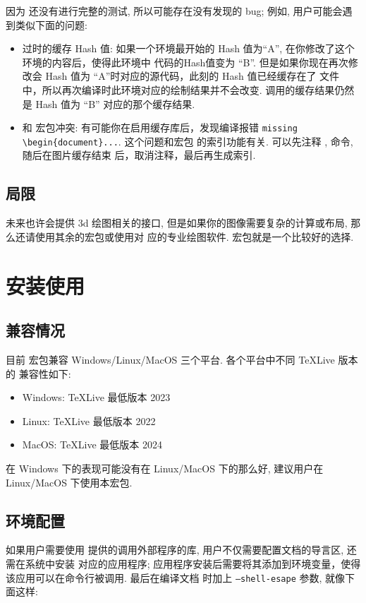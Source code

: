 \documentclass[
  hyper, lang=cn, 
  class=l3dox, 
]{../../zlatex/code/ztex}
\begin{document}
因为 \ztikz{} 还没有进行完整的测试, 所以可能存在没有发现的 bug; 例如, 用户可能会遇到类似下面的问题:
\begin{itemize}
  \item 过时的缓存 Hash 值: 如果一个环境最开始的 Hash 值为``A'', 在你修改了这个环境的内容后，使得此环境中
    代码的Hash值变为 ``B''. 但是如果你现在再次修改会 Hash 值为 ``A''时对应的源代码，此刻的 Hash 值已经缓存在了
    文件  中，所以再次编译时此环境对应的绘制结果并不会改变. 调用的缓存结果仍然是 Hash 值为 ``B''
    对应的那个缓存结果. 
  \item 和  宏包冲突: 有可能你在启用缓存库后，发现编译报错 \texttt{missing \textbackslash begin\{document\}...}. 
    这个问题和宏包  的索引功能有关. 可以先注释 ,  命令, 随后在图片缓存结束
    后，取消注释，最后再生成索引.
\end{itemize}


\subsection{局限}
\zTikZ{} 未来也许会提供 3d 绘图相关的接口, 但是如果你的图像需要复杂的计算或布局, 那么还请使用其余的宏包或使用对
应的专业绘图软件.  宏包就是一个比较好的选择.


\clearpage
\section{安装使用}


\subsection{兼容情况}
目前  宏包兼容 Windows/Linux/MacOS 三个平台. 各个平台中不同 \TeX{}Live 版本的
兼容性如下:

\hspace*{3.5cm}\parbox{\linewidth}{
\begin{itemize}
  \item Windows: \TeX{}Live 最低版本 2023
  \item Linux: \TeX{}Live 最低版本 2022
  \item MacOS: \TeX{}Live 最低版本 2024
\end{itemize}}

\ztikz{} 在 Windows 下的表现可能没有在 Linux/MacOS 下的那么好, 建议用户在 Linux/MacOS 下使用本宏包.


\subsection{环境配置}
如果用户需要使用 \zTikZ{} 提供的调用外部程序的库, 用户不仅需要配置文档的导言区, 还需在系统中安装
对应的应用程序; 应用程序安装后需要将其添加到环境变量，使得该应用可以在命令行被调用. 最后在编译文档
时加上 \texttt{--shell-esape} 参数, 就像下面这样:
\def\exampleUR{}
\end{document}
